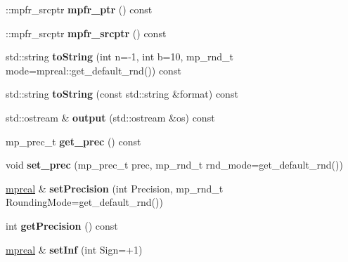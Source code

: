 \begin{DoxyCompactItemize}
\mbox{\label{classmpfr_1_1mpreal_abf7ba82a953b2501b71d736f83454ea1}} 
\+::mpfr\+\_\+srcptr {\bfseries mpfr\+\_\+ptr} () const
\item 
\mbox{\label{classmpfr_1_1mpreal_ab0b98cfae079d43759f42bcb48e3485e}} 
\+::mpfr\+\_\+srcptr {\bfseries mpfr\+\_\+srcptr} () const
\item 
\mbox{\label{classmpfr_1_1mpreal_ae4aae5f6374f94dbad8152cad907be01}} 
std\+::string {\bfseries to\+String} (int n=-\/1, int b=10, mp\+\_\+rnd\+\_\+t mode=mpreal\+::get\+\_\+default\+\_\+rnd()) const
\item 
\mbox{\label{classmpfr_1_1mpreal_a2fae3d876f85d4d04bd2ea606b5ccbb6}} 
std\+::string {\bfseries to\+String} (const std\+::string \&format) const
\item 
\mbox{\label{classmpfr_1_1mpreal_a37b8d3fdbc7313f4f6dbad77b2f31e1c}} 
std\+::ostream \& {\bfseries output} (std\+::ostream \&os) const
\item 
\mbox{\label{classmpfr_1_1mpreal_a3a7ea3586a91489fa7509562becd304d}} 
mp\+\_\+prec\+\_\+t {\bfseries get\+\_\+prec} () const
\item 
\mbox{\label{classmpfr_1_1mpreal_a7e096c82de9a582878e55834733788bc}} 
void {\bfseries set\+\_\+prec} (mp\+\_\+prec\+\_\+t prec, mp\+\_\+rnd\+\_\+t rnd\+\_\+mode=get\+\_\+default\+\_\+rnd())
\item 
\mbox{\label{classmpfr_1_1mpreal_a2f7d64b1aa87f08a4f2725572bd6e5ba}} 
\hyperlink{classmpfr_1_1mpreal}{mpreal} \& {\bfseries set\+Precision} (int Precision, mp\+\_\+rnd\+\_\+t Rounding\+Mode=get\+\_\+default\+\_\+rnd())
\item 
\mbox{\label{classmpfr_1_1mpreal_ab554a180ceca6eed0e5798b316f944b0}} 
int {\bfseries get\+Precision} () const
\item 
\mbox{\label{classmpfr_1_1mpreal_afbd03fac6b9d71afc2c18d29119ab1ab}} 
\hyperlink{classmpfr_1_1mpreal}{mpreal} \& {\bfseries set\+Inf} (int Sign=+1)

\end{DoxyCompactItemize}
